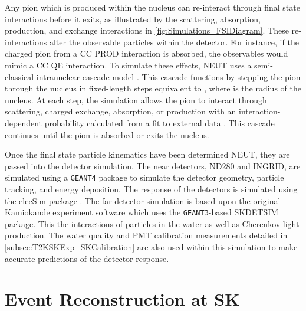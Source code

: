 Any pion which is produced within the nucleus can re-interact through final state interactions before it exits, as illustrated by the scattering, absorption, production, and exchange interactions in \autoref{fig:Simulations_FSIDiagram}. These re-interactions alter the observable particles within the detector. For instance, if the charged pion from a CC PROD interaction is absorbed, the observables would mimic a CC QE interaction. To simulate these effects, NEUT uses a semi-classical intranuclear cascade model \cite{Hayato2021}. This cascade functions by stepping the pion through the nucleus in fixed-length steps equivalent to , where  is the radius of the nucleus. At each step, the simulation allows the pion to interact through scattering, charged exchange, absorption, or production with an interaction-dependent probability calculated from a fit to external data \cite{PhysRevD.99.052007}. This cascade continues until the pion is absorbed or exits the nucleus.

Once the final state particle kinematics have been determined   NEUT, they are passed into the detector simulation. The near detectors, ND280 and INGRID, are simulated using a \texttt{GEANT4} package \cite{t2k_det,geant4} to simulate the detector geometry, particle tracking, and energy deposition. The response of the detectors is simulated using the elecSim package \cite{t2k_det}. The far detector simulation is based upon the original Kamiokande experiment software which uses the \texttt{GEANT3}-based SKDETSIM \cite{Brun:1987ma,t2k_det} package. This   the interactions of particles in the water as well as Cherenkov light production. The water quality and PMT calibration measurements detailed in \autoref{subsec:T2KSKExp_SKCalibration} are also used within this simulation to make accurate predictions of the detector response.

\section{Event Reconstruction at SK}
\label{sec:Simulation_Reconstruction}

